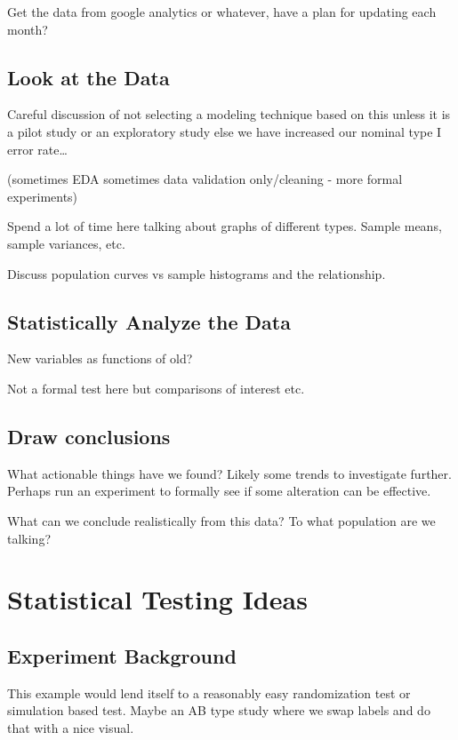 \documentclass[]{book}
\begin{document}
Get the data from google analytics or whatever, have a plan for updating
each month?

\subsection{Look at the Data }\label{look-at-the-data}

Careful discussion of not selecting a modeling technique based on this
unless it is a pilot study or an exploratory study else we have
increased our nominal type I error rate\ldots{}

(sometimes EDA sometimes data validation only/cleaning - more formal
experiments)

Spend a lot of time here talking about graphs of different types. Sample
means, sample variances, etc.

Discuss population curves vs sample histograms and the relationship.

\subsection{Statistically Analyze the
Data}\label{statistically-analyze-the-data}

New variables as functions of old?

Not a formal test here but comparisons of interest etc.

\subsection{Draw conclusions}\label{draw-conclusions}

What actionable things have we found? Likely some trends to investigate
further. Perhaps run an experiment to formally see if some alteration
can be effective.

What can we conclude realistically from this data? To what population
are we talking?

\section{Statistical Testing Ideas}\label{statistical-testing-ideas}

\subsection{Experiment Background}\label{experiment-background-1}

This example would lend itself to a reasonably easy randomization test
or simulation based test. Maybe an AB type study where we swap labels
and do that with a nice visual.
\end{document}
